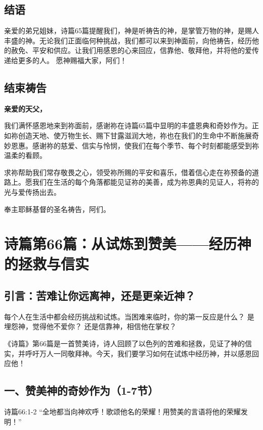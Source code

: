 \documentclass[a4paper, 12pt]{article}
\begin{document}
\subsection*{结语}
亲爱的弟兄姐妹，诗篇65篇提醒我们，神是听祷告的神，是掌管万物的神，是赐人丰盛的神。无论我们正面临何种挑战，我们都可以来到神面前，向他祷告，经历他的赦免、平安和供应。让我们用感恩的心来回应，信靠他、敬拜他，并将他的爱传递给更多的人。
愿神赐福大家，阿们！
\subsection*{结束祷告}
\textbf{亲爱的天父，}

我们满怀感恩地来到祢面前，感谢祢在诗篇65篇中显明的丰盛恩典和奇妙作为。正如祢创造天地、使万物生长、赐下甘露滋润大地，祢也在我们的生命中不断施展奇妙恩惠。感谢祢的慈爱、信实与怜悯，使我们在每个季节、每个时刻都能感受到祢温柔的看顾。

求祢帮助我们常存敬畏之心，领受祢所赐的平安和喜乐，借着信心走在祢预备的道路上。愿我们在生活的每个角落都能见证祢的美善，成为祢恩典的见证人，将祢的光与爱传扬出去。

奉主耶稣基督的圣名祷告，阿们。
\newpage
\section{诗篇第66篇：从试炼到赞美——经历神的拯救与信实}
\subsection*{引言：苦难让你远离神，还是更亲近神？}
\hspace{0.6cm}每个人在生活中都会经历挑战和试炼。当困难来临时，你的第一反应是什么？
是埋怨神，觉得他不爱你？
还是信靠神，相信他在掌权？

《诗篇》第66篇是一首赞美诗，诗人回顾了以色列的苦难和拯救，见证了神的信实，并呼吁万人一同敬拜神。今天，我们要学习如何在试炼中经历神，并以感恩回应他！

\subsection*{一、赞美神的奇妙作为（1-7节）}
\hspace{0.6cm}诗篇66:1-2 “全地都当向神欢呼！歌颂他名的荣耀！用赞美的言语将他的荣耀发明！”
\end{document}
